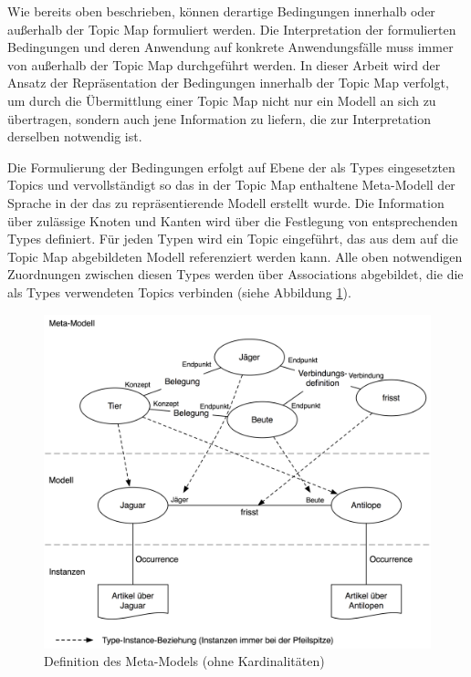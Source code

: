 Wie bereits oben beschrieben, können derartige Bedingungen innerhalb oder außerhalb der Topic Map formuliert werden. Die Interpretation der formulierten Bedingungen und deren Anwendung auf konkrete Anwendungsfälle muss immer von außerhalb der Topic Map durchgeführt werden. In dieser Arbeit wird der Ansatz der Repräsentation der Bedingungen innerhalb der Topic Map verfolgt, um durch die Übermittlung einer Topic Map nicht nur ein Modell an sich zu übertragen, sondern auch jene Information zu liefern, die zur Interpretation derselben notwendig ist.

Die Formulierung der Bedingungen erfolgt auf Ebene der als Types eingesetzten Topics und vervollständigt so das in der Topic Map enthaltene Meta-Modell der Sprache in der das zu repräsentierende Modell erstellt wurde. Die Information über zulässige Knoten und Kanten wird über die Festlegung von entsprechenden Types definiert. Für jeden Typen wird ein Topic eingeführt, das aus dem auf die Topic Map abgebildeten Modell referenziert werden kann. Alle oben notwendigen Zuordnungen zwischen diesen Types werden über Associations abgebildet, die die als Types verwendeten Topics verbinden (siehe Abbildung \ref{fig:img_Persistenz_MetaModelDef}).

\begin{figure}[htbp]
	\centering
		\includegraphics[width=13cm]{img/Persistenz/MetaModelDef.png}
	\caption{Definition des Meta-Models (ohne Kardinalitäten)}
	\label{fig:img_Persistenz_MetaModelDef}
\end{figure}

